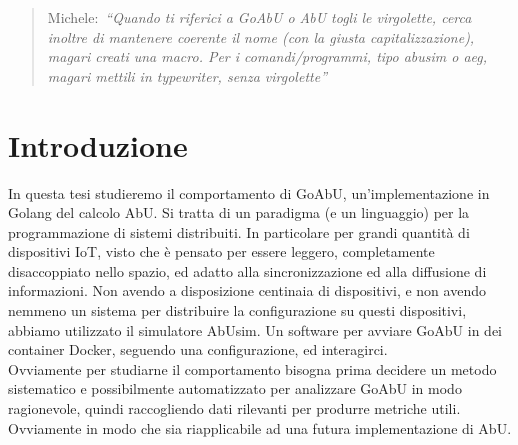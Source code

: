 \documentclass[12pt, a4paper]{article}
\newcommand{\michele}[1]{{\color{red}Michele:~}{\itshape``{#1}''}}
\begin{document}
\begin{abstract}
    \michele{Quando ti riferici a GoAbU o AbU togli le virgolette, cerca inoltre di mantenere coerente il nome (con la giusta capitalizzazione), magari creati una macro. Per i comandi/programmi, tipo abusim o aeg, magari mettili in typewriter, senza virgolette}
\end{abstract}

\newpage
\tableofcontents

\newpage

\section{Introduzione}

In questa tesi studieremo il comportamento di GoAbU, un'implementazione in Golang del calcolo AbU. Si tratta di un paradigma (e un linguaggio) per la programmazione di sistemi distribuiti.
In particolare per grandi quantità di dispositivi IoT, visto che è pensato per essere leggero, completamente disaccoppiato nello spazio, ed adatto alla sincronizzazione ed alla diffusione di informazioni.
Non avendo a disposizione centinaia di dispositivi, e non avendo nemmeno un sistema per distribuire la configurazione su questi dispositivi, abbiamo utilizzato il simulatore AbUsim. Un software per avviare GoAbU in dei container Docker, seguendo una configurazione, ed interagirci.\\
Ovviamente per studiarne il comportamento bisogna prima decidere un metodo sistematico e possibilmente automatizzato per analizzare GoAbU in modo ragionevole, quindi raccogliendo dati rilevanti per produrre metriche utili. Ovviamente in modo che sia riapplicabile ad una futura implementazione di AbU.
\end{document}

